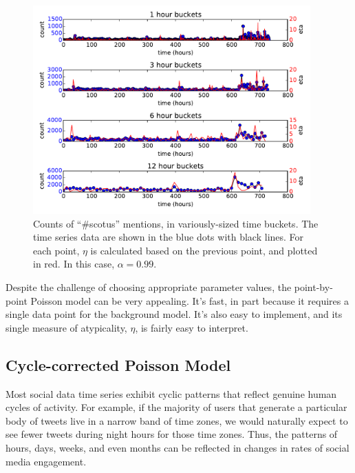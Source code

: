 \documentclass{article}
\begin{document}
\begin{figure}
\begin{center}
\includegraphics[width=0.95\textwidth]{fig/scotus_bucket_size.pdf}
\caption{Counts of ``\#scotus'' mentions, in variously-sized time buckets. The time
series data are shown in the blue dots with black lines. For each point, $\eta$ is
calculated based on the previous point, and plotted in red. In this case,
$\alpha = 0.99$.}
\label{fig:scotus2}
\end{center}
\end{figure}

Despite the challenge of choosing appropriate parameter values, the
point-by-point Poisson model can be very appealing. It's fast, in part
because it requires a single data point for the background model. It's also
easy to implement, and its single measure of atypicality, $\eta$, is fairly easy
to interpret. 

\subsection{Cycle-corrected Poisson Model}
\label{ccpm}

Most social data time series exhibit cyclic patterns that reflect genuine human
cycles of activity. For example, if the majority of users that generate a
particular body of tweets live in a narrow band of time zones, we would
naturally expect to see fewer tweets during night hours for those time zones.
Thus, the patterns of hours, days, weeks, and even months can be reflected in
changes in rates of social media engagement. 
\end{document}
